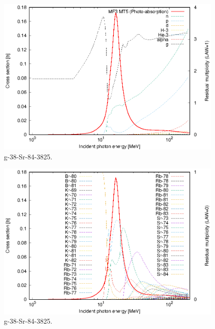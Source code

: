 \begin{figure}
 \includegraphics[width=\linewidth]{eps/g_38-Sr-84_3825.eps}
  \caption{g-38-Sr-84-3825.}
\end{figure}
\begin{figure}
 \includegraphics[width=\linewidth]{eps-law0/g_38-Sr-84_3825.eps}
 \caption{g-38-Sr-84-3825.}
\end{figure}
\newpage \clearpage

